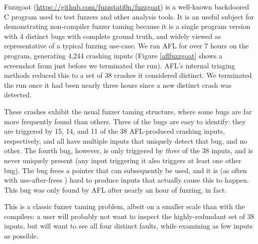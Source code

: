  Fuzzgoat (\url{https://github.com/fuzzstati0n/fuzzgoat}) is a well-known backdoored C program used to test fuzzers and other analysis tools.  It is an useful subject for demonstrating non-compiler fuzzer taming because it is a single program version with 4 distinct bugs with complete ground truth, and widely viewed as representative of a typical fuzzing use-case.  We ran AFL \cite{aflfuzz} for over 7 hours on the program, generating 4,244 crashing inputs (Figure \ref{aflfuzzgoat} shows a screenshot from just before we terminated the run).  AFL's internal triaging methods reduced this to a set of 38 crashes it considered distinct.  We terminated the run once it had been nearly three hours since a new distinct crash was detected.

  These crashes exhibit the usual fuzzer taming structure, where some bugs are far more frequently found than others.  Three of the bugs are easy to identify: they are triggered by 15, 14, and 11 of the 38 AFL-produced crashing inputs, respectively, and all have multiple inputs that uniquely detect that bug, and no other.  The fourth bug, however, is only triggered by \emph{three} of the 38 inputs, and is never uniquely present (any input triggering it also triggers at least one other bug).  The bug frees a pointer that can subsequently be used, and it is (as often with use-after-frees \cite{DangSan}) hard to produce inputs that actually cause this to happen. This bug was only found by AFL after nearly an hour of fuzzing, in fact.

  This is a classic fuzzer taming problem, albeit on a smaller scale than with the compilers:  a user will probably not want to inspect the highly-redundant set of 38 inputs, but will want to see all four distinct faults, while examining as few inputs as possible.

